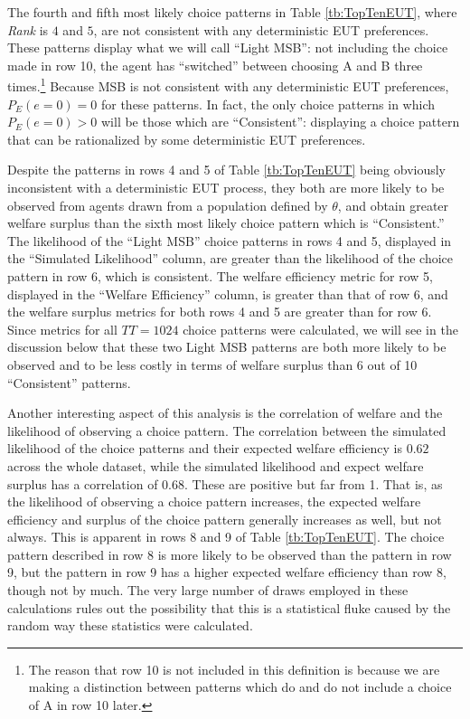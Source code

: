 \documentclass[../main.tex]{subfiles}
\begin{document}
The fourth and fifth most likely choice patterns in Table \ref{tb:TopTenEUT}, where \textit{Rank} is $4$ and $5$, are not consistent with any deterministic EUT preferences.
These patterns display what we will call \enquote{Light MSB}: not including the choice made in row 10, the agent has \enquote{switched} between choosing A and B three times.\footnote{
	The reason that row 10 is not included in this definition is because we are making a distinction between patterns which do and do not include a choice of A in row 10 later.
}
Because MSB is not consistent with any deterministic EUT preferences, $P_E(e=0)=0$ for these patterns.
In fact, the only choice patterns in which $P_E(e=0)>0$ will be those which are \enquote{Consistent}: displaying a choice pattern that can be rationalized by some deterministic EUT preferences.

Despite the patterns in rows 4 and 5 of Table \ref{tb:TopTenEUT} being obviously inconsistent with a deterministic EUT process, they both are more likely to be observed from agents drawn from a population defined by $\theta$, and obtain greater welfare surplus than the sixth most likely choice pattern which is \enquote{Consistent.}
The likelihood of the \enquote{Light MSB} choice patterns in rows 4 and 5, displayed in the \enquote{Simulated Likelihood} column, are greater than the likelihood of the choice pattern in row 6, which is consistent.
The welfare efficiency metric for row 5, displayed in the \enquote{Welfare Efficiency} column, is greater than that of row 6, and the welfare surplus metrics for both rows 4 and 5 are greater than for row 6.
Since metrics for all $TT = 1024$ choice patterns were calculated, we will see in the discussion below that these two Light MSB patterns are both more likely to be observed and to be less costly in terms of welfare surplus than 6 out of 10 \enquote{Consistent} patterns.

Another interesting aspect of this analysis is the correlation of welfare and the likelihood of observing a choice pattern.
The correlation between the simulated likelihood of the choice patterns and their expected welfare efficiency is $0.62$ across the whole dataset, while the simulated likelihood and expect welfare surplus has a correlation of $0.68$.
These are positive but far from 1.
That is, as the likelihood of observing a choice pattern increases, the expected welfare efficiency and surplus of the choice pattern generally increases as well, but not always.
This is apparent in rows 8 and 9 of Table \ref{tb:TopTenEUT}.
The choice pattern described in row 8 is more likely to be observed than the pattern in row 9, but the pattern in row 9 has a higher expected welfare efficiency than row 8, though not by much.
The very large number of draws employed in these calculations rules out the possibility that this is a statistical fluke caused by the random way these statistics were calculated.
\end{document}

